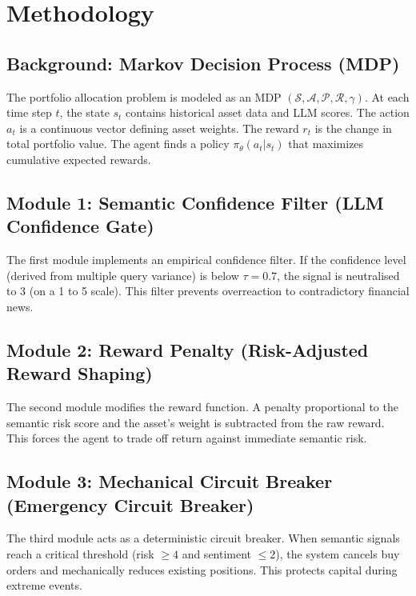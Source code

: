 \documentclass{article}
\begin{document}
\section{Methodology}

\subsection{Background: Markov Decision Process (MDP)}

The portfolio allocation problem is modeled as an MDP $(\mathcal{S}, \mathcal{A}, \mathcal{P}, \mathcal{R}, \gamma)$. At each time step $t$, the state $s_t$ contains historical asset data and LLM scores. The action $a_t$ is a continuous vector defining asset weights. The reward $r_t$ is the change in total portfolio value. The agent finds a policy $\pi_\theta(a_t|s_t)$ that maximizes cumulative expected rewards.

\subsection{Module 1: Semantic Confidence Filter (LLM Confidence Gate)}

The first module implements an empirical confidence filter. If the confidence level (derived from multiple query variance) is below $\tau = 0.7$, the signal is neutralised to 3 (on a 1 to 5 scale). This filter prevents overreaction to contradictory financial news.

\subsection{Module 2: Reward Penalty (Risk-Adjusted Reward Shaping)}

The second module modifies the reward function. A penalty proportional to the semantic risk score and the asset's weight is subtracted from the raw reward. This forces the agent to trade off return against immediate semantic risk.

\subsection{Module 3: Mechanical Circuit Breaker (Emergency Circuit Breaker)}

The third module acts as a deterministic circuit breaker. When semantic signals reach a critical threshold (risk $\ge 4$ and sentiment $\le 2$), the system cancels buy orders and mechanically reduces existing positions. This protects capital during extreme events.
\end{document}
